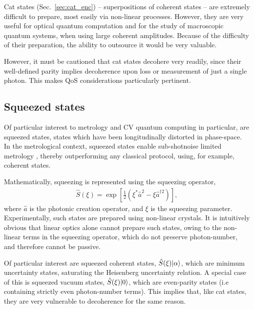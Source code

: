 Cat states (Sec.~\ref{sec:cat_enc}) -- superpositions of coherent states -- are extremely difficult to prepare, most easily via non-linear processes. However, they are very useful for optical quantum computation and for the study of macroscopic quantum systems, when using large coherent amplitudes. Because of the difficulty of their preparation, the ability to outsource it would be very valuable.

However, it must be cautioned that cat states decohere very readily, since their well-defined parity implies decoherence upon loss or measurement of just a single photon. This makes QoS considerations particularly pertinent.

%
%

\subsection{Squeezed states} \label{sec:squeezed} 

Of particular interest to metrology and CV quantum computing in particular, are squeezed states, states which have been longitudinally distorted in phase-space. In the metrological context, squeezed states enable sub-shotnoise limited metrology \cite{???}, thereby outperforming any classical protocol, using, for example, coherent states.

Mathematically, squeezing is represented using the squeezing operator,
\begin{align}
\hat{S}(\xi) = \exp \left[ \frac{1}{2}(\xi^*\hat{a}^2 - \xi{\hat{a}^{\dag 2}})\right],
\end{align}
where $\hat{a}$ is the photonic creation operator, and $\xi$ is the squeezing parameter. Experimentally, such states are prepared using non-linear crystals. It is intuitively obvious that linear optics alone cannot prepare such states, owing to the non-linear terms in the squeezing operator, which do not preserve photon-number, and therefore cannot be passive.

Of particular interest are squeezed coherent states, $\hat{S}(\xi) |\alpha\rangle$, which are minimum uncertainty states, saturating the Heisenberg uncertainty relation. A special case of this is squeezed vacuum states, $\hat{S}(\xi) |0\rangle$, which are even-parity states (i.e containing strictly even photon-number terms). This implies that, like cat states, they are very vulnerable to decoherence for the same reason.

